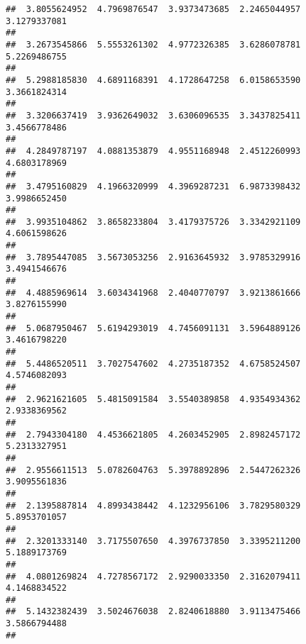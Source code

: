 \documentclass[]{article}
\begin{document}
\begin{verbatim}
##  3.8055624952  4.7969876547  3.9373473685  2.2465044957  3.1279337081 
##                                                                       
##  3.2673545866  5.5553261302  4.9772326385  3.6286078781  5.2269486755 
##                                                                       
##  5.2988185830  4.6891168391  4.1728647258  6.0158653590  3.3661824314 
##                                                                       
##  3.3206637419  3.9362649032  3.6306096535  3.3437825411  3.4566778486 
##                                                                       
##  4.2849787197  4.0881353879  4.9551168948  2.4512260993  4.6803178969 
##                                                                       
##  3.4795160829  4.1966320999  4.3969287231  6.9873398432  3.9986652450 
##                                                                       
##  3.9935104862  3.8658233804  3.4179375726  3.3342921109  4.6061598626 
##                                                                       
##  3.7895447085  3.5673053256  2.9163645932  3.9785329916  3.4941546676 
##                                                                       
##  4.4885969614  3.6034341968  2.4040770797  3.9213861666  3.8276155990 
##                                                                       
##  5.0687950467  5.6194293019  4.7456091131  3.5964889126  3.4616798220 
##                                                                       
##  5.4486520511  3.7027547602  4.2735187352  4.6758524507  4.5746082093 
##                                                                       
##  2.9621621605  5.4815091584  3.5540389858  4.9354934362  2.9338369562 
##                                                                       
##  2.7943304180  4.4536621805  4.2603452905  2.8982457172  5.2313327951 
##                                                                       
##  2.9556611513  5.0782604763  5.3978892896  2.5447262326  3.9095561836 
##                                                                       
##  2.1395887814  4.8993438442  4.1232956106  3.7829580329  5.8953701057 
##                                                                       
##  2.3201333140  3.7175507650  4.3976737850  3.3395211200  5.1889173769 
##                                                                       
##  4.0801269824  4.7278567172  2.9290033350  2.3162079411  4.1468834522 
##                                                                       
##  5.1432382439  3.5024676038  2.8240618880  3.9113475466  3.5866794488 
##                                                                       

\end{verbatim}
\end{document}
